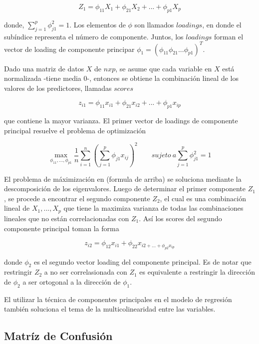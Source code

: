 \documentclass[a4paper,12pt]{Latex/Classes/PhDthesisPSnPDF}
\begin{document}
$$ Z_{1} = \phi_{11}X_{1} + \phi_{21}X_{2} + ... + \phi_{p1}X_{p} $$

donde, $ \sum_{j=1}^{p} \phi_{j1}^{2} = 1 $. Los elementos de $ \phi $ son llamados $loadings$, en donde el subíndice representa el número de componente. Juntos, los $loadings$ forman el vector de loading de componente principar $\phi_{1} = (\phi_{11} \phi_{21}... \phi_{p1})^T$.

Dado una matriz de datos $X$ de $n x p$, se asume que cada variable en $X$ está normalizada -tiene media 0-, entonces se obtiene la combinación lineal de los valores de los predictores, llamadas $scores$

$$ z_{i1} = \phi_{11} x_{i1} + \phi_{21} x_{i2} + ... + \phi_{p1} x_{ip} $$

que contiene la mayor varianza. El primer vector de loadings de componente principal resuelve el problema de optimización

$$ \max_{\phi_{11}, ..., \phi_{p1}}
\frac{1}{n} \sum_{i = 1}^{n} (\sum_{j=1}^{p} \phi_{j1} x_{ij})^2
\qquad sujeto \ a  \sum_{j=1}^{p} \phi_{j1}^{2} = 1
$$

El problema de máximización en (formula de arriba) se soluciona mediante la descomposición de los eigenvalores. Luego de determinar el primer componente $Z_{1}$, se procede a encontrar el segundo componente $Z_{2}$, el cual es una combinación lineal de $ X_{1}, ..., X_{p} $ que tiene la maximiza varianza de todas las combinaciones lineales que no están correlacionadas con $Z_{1}$. Así los scores del segundo componente principal toman la forma

$$ z_{i2} = \phi_{12}x_{i1} + \phi_{22}x_{i2 + ... + \phi_{p2}x_{ip}} $$

donde $\phi_{2}$ es el segundo vector loading del componente principal. Es de notar que restringir $Z_{2}$ a no ser correlasionada con $Z_{1}$ es equivalente a restringir la dirección de $\phi_{2}$ a ser ortogonal a la dirección de $\phi_{1}$.

El utilizar la técnica de componentes principales en el modelo de regresión también soluciona el tema de la multicolinearidad entre las variables. 

\subsection{Matríz de Confusión}
\end{document}
